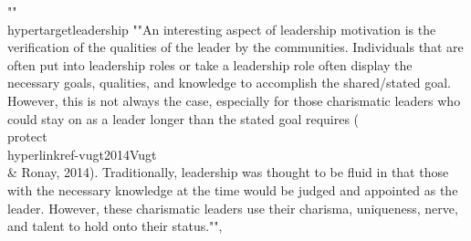 {{{{{{""\\hypertarget{leadership}{%
""An interesting aspect of leadership motivation is the verification of the qualities of the leader by the communities. Individuals that are often put into leadership roles or take a leadership role often display the necessary goals, qualities, and knowledge to accomplish the shared/stated goal. However, this is not always the case, especially for those charismatic leaders who could stay on as a leader longer than the stated goal requires (\\protect\\hyperlink{ref-vugt2014}{Vugt \\& Ronay, 2014}). Traditionally, leadership was thought to be fluid in that those with the necessary knowledge at the time would be judged and appointed as the leader. However, these charismatic leaders use their charisma, uniqueness, nerve, and talent to hold onto their status."", 
}}}}}}}
